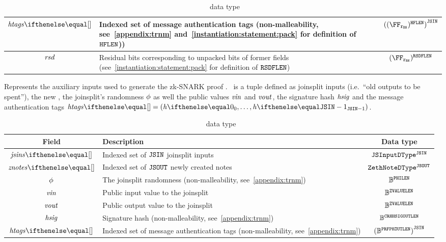 \begin{description}
\begin{table}[H]
\begin{tabular}{cp{20em}c}
            $\htags{}$ & Indexed set of message authentication tags (non-malleability, see~\cref{appendix:trnm} and~\cref{instantiation:statement:pack} for definition of $\mathtt{HFLEN}$)) & ${((\FFx{\rBN})^{\htagFLen})}^{\jsin}$\\ \midrule
            $\mathit{rsd}$ & Residual bits corresponding to unpacked bits of former fields (see~\cref{instantiation:statement:pack} for definition of $\mathtt{RSDFLEN}$) & $(\FFx{\rBN})^{\resBitsFLen}$\\ \bottomrule
        \end{tabular}
        \caption{\primInputDType~data type}\label{zeth-protocol:tab:priminputs}
        \end{table}
    \item[\auxInputDType] Represents the auxiliary inputs used to generate the zk-SNARK proof \zkp. \auxinputs~is a tuple defined as \gls{joinsplit} inputs (i.e.~``old outputs to be spent''), the new \zethnotes{}, the joinsplit's randomness $\mathit{\phi}$ as well the public values $\mathit{vin}$ and $\mathit{vout}$, the signature hash $\mathit{hsig}$ and the message authentication tags $\htags{} = \smalltuple{\htag{0}, \ldots, \htag{\jsin-1}}$.
        \begin{table}[H]
        \centering
        \begin{tabular}{cp{20em}c}
            Field & Description & Data type\\ \toprule
            $\jsins{}$ & Indexed set of $\mathtt{JSIN}$ \gls{joinsplit} inputs & ${\mathtt{JSInputDType}}^{\mathtt{JSIN}}$\\ \midrule
            $\znotes{}$ & Indexed set of $\mathtt{JSOUT}$ newly created notes & ${\mathtt{ZethNoteDType}}^{\mathtt{JSOUT}}$\\ \midrule
            $\mathit{\phi}$ & The \gls{joinsplit} randomness (non-malleability, see~\cref{appendix:trnm}) & $\mathbb{B}^{\mathtt{PHILEN}}$\\ \midrule
            $\mathit{vin}$ & Public input value to the \gls{joinsplit} & $\mathbb{B}^{\mathtt{ZVALUELEN}}$\\ \midrule
            $\mathit{vout}$ & Public output value to the \gls{joinsplit} & $\mathbb{B}^{\mathtt{ZVALUELEN}}$\\ \midrule
            $\mathit{hsig}$ & Signature hash (non-malleability, see~\cref{appendix:trnm}) & $\mathbb{B}^{\mathtt{CRHHSIGOUTLEN}}$\\ \midrule
            $\htags{}$ & Indexed set of message authentication tags (non-malleability, see~\cref{appendix:trnm}) & ${(\mathbb{B}^{\mathtt{PRFPKOUTLEN}})}^{\mathtt{JSIN}}$\\ \bottomrule
        \end{tabular}
        \caption{\auxInputDType~data type}\label{zeth-protocol:tab:auxinputs}

\end{table}
\end{description}
